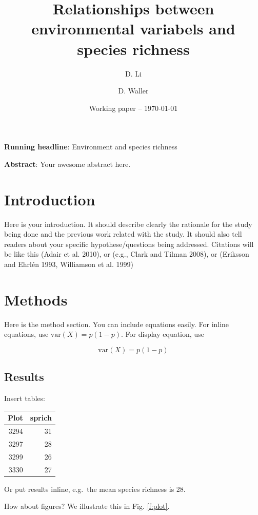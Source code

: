 \documentclass[12pt]{article} %
\title{Relationships between environmental variabels and species richness}
\author{D. Li \and D. Waller}
\date{Working paper -- \today}
\begin{document}
\maketitle





\doublespacing
\textbf{Running headline}: Environment and species richness

\textbf{Abstract}: Your awesome abstract here.

\clearpage

\section{Introduction}\label{introduction}

Here is your introduction. It should describe clearly the rationale for
the study being done and the previous work related with the study. It
should also tell readers about your specific hypothese/questions being
addressed. Citations will be like this (Adair et al. 2010), or (e.g.,
Clark and Tilman 2008), or (Eriksson and Ehrlén 1993, Williamson et al.
1999)

\section{Methods}\label{methods}

Here is the method section. You can include equations easily. For inline
equations, use \(\text{var}(X) = p(1-p)\). For display equation, use

\begin{equation}
\text{var}(X) = p(1-p)
\end{equation}

\subsection{Results}\label{results}

Insert tables:

\begin{longtable}[c]{@{}rr@{}}
\toprule
Plot & sprich\tabularnewline
\midrule
\endhead
3294 & 31\tabularnewline
3297 & 28\tabularnewline
3299 & 26\tabularnewline
3330 & 27\tabularnewline
\bottomrule
\end{longtable}

Or put results inline, e.g.~the mean species richness is 28.

How about figures? We illustrate this in Fig. \ref{f:plot}.
\end{document}
